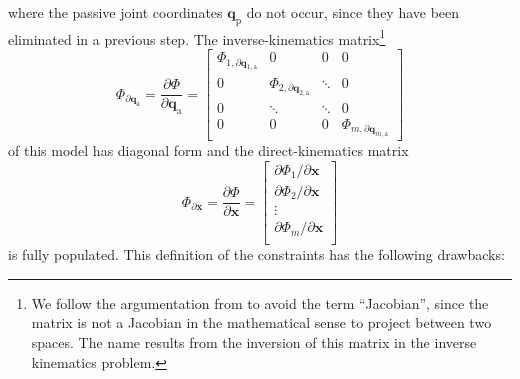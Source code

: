 \documentclass[robotics,article,submit,moreauthors,pdftex]{Definitions/mdpi}
\newcommand{\bm}[1]{\boldsymbol{#1}}
\let\Phi\varPhi
\begin{document}
%
where the passive joint coordinates $\bm{q}_{\mathrm{p}}$ do not occur, since they have been eliminated in a previous step.
The inverse-kinematics matrix\footnote{We follow the argumentation from \cite{Gogu2008} to avoid the term ``Jacobian'', since the matrix is not a Jacobian in the mathematical sense to project between two spaces. The name results from the inversion of this matrix in the inverse kinematics problem.}
%
\begin{equation}
\bm{\Phi}_{\partial \bm{q}_{\mathrm{a}}}
=
\frac{\partial \bm{\Phi}}{\partial \bm{q}_{\mathrm{a}}}
=
\begin{bmatrix}
\Phi_{1,\partial \bm{q}_{1,\mathrm{a}}} & 0 & 0 & 0\\
0 & \Phi_{2,\partial \bm{q}_{2,\mathrm{a}}} & \ddots & 0 \\
0 & \ddots & \ddots & 0 \\
0 & 0 & 0 & \Phi_{m,\partial \bm{q}_{m,\mathrm{a}}}
\end{bmatrix}
\label{equ:PKM_phi_grad_q}
\end{equation}
%
of this model has diagonal form and the direct-kinematics matrix
%
\begin{equation}
\bm{\Phi}_{\partial \bm{x}}
=
\frac{\partial \bm{\Phi}}{\partial \bm{x}}
=
\begin{bmatrix}
\partial \Phi_1/\partial \bm{x}\\
\partial \Phi_2/\partial \bm{x}\\
\vdots \\
\partial \Phi_m/\partial \bm{x}\\
\end{bmatrix}
\label{equ:PKM_phi_grad_x}
\end{equation}
%
is fully populated.
This definition of the constraints has the following drawbacks:
\end{document}
